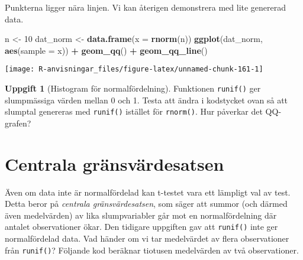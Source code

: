 \documentclass[
]{book}
\newenvironment{Shaded}{\begin{snugshade}}{\end{snugshade}}
\newcommand{\AttributeTok}[1]{\textcolor[rgb]{0.13,0.29,0.53}{#1}}
\newcommand{\DecValTok}[1]{\textcolor[rgb]{0.00,0.00,0.81}{#1}}
\newcommand{\FunctionTok}[1]{\textcolor[rgb]{0.13,0.29,0.53}{\textbf{#1}}}
\newcommand{\NormalTok}[1]{#1}
\newcommand{\OtherTok}[1]{\textcolor[rgb]{0.56,0.35,0.01}{#1}}
\newcommand{\SpecialCharTok}[1]{\textcolor[rgb]{0.81,0.36,0.00}{\textbf{#1}}}
\theoremstyle{definition}
\theoremstyle{definition}
\theoremstyle{definition}
\newtheorem{exercise}{Uppgift}[chapter]
\theoremstyle{definition}
\theoremstyle{remark}
\begin{document}
Punkterna ligger nära linjen. Vi kan återigen demonstrera med lite genererad data.

\begin{Shaded}
\begin{Highlighting}[]
\NormalTok{n }\OtherTok{\textless{}{-}} \DecValTok{10}
\NormalTok{dat\_norm }\OtherTok{\textless{}{-}} \FunctionTok{data.frame}\NormalTok{(}\AttributeTok{x =} \FunctionTok{rnorm}\NormalTok{(n))}
\FunctionTok{ggplot}\NormalTok{(dat\_norm, }\FunctionTok{aes}\NormalTok{(}\AttributeTok{sample =}\NormalTok{ x)) }\SpecialCharTok{+} \FunctionTok{geom\_qq}\NormalTok{() }\SpecialCharTok{+} \FunctionTok{geom\_qq\_line}\NormalTok{()}
\end{Highlighting}
\end{Shaded}

\begin{center}\texttt{[image: R-anvisningar\_files/figure-latex/unnamed-chunk-161-1]} \end{center}

\begin{exercise}[Histogram för normalfördelning]
Funktionen \texttt{runif()} ger slumpmässiga värden mellan 0 och 1. Testa att ändra i kodstycket ovan så att slumptal genereras med \texttt{runif()} istället för \texttt{rnorm()}. Hur påverkar det QQ-grafen?
\end{exercise}

\hypertarget{centrala-gruxe4nsvuxe4rdesatsen}{%
\section{Centrala gränsvärdesatsen}\label{centrala-gruxe4nsvuxe4rdesatsen}}

Även om data inte är normalfördelad kan t-testet vara ett lämpligt val av test. Detta beror på \emph{centrala gränsvärdesatsen}, som säger att summor (och därmed även medelvärden) av lika slumpvariabler går mot en normalfördelning där antalet observationer ökar. Den tidigare uppgiften gav att \texttt{runif()} inte ger normalfördelad data. Vad händer om vi tar medelvärdet av flera observationer från \texttt{runif()}? Följande kod beräknar tiotusen medelvärden av två observationer.
\end{document}
